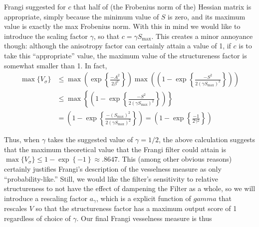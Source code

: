     Frangi suggested for $c$ that half of (the Frobenius norm of the) Hessian matrix is appropriate, simply because the minimum value of $S$ is zero, and its maximum value is exactly the max Frobenius norm. With this in mind we would like to introduce the scaling factor
    $\gamma$, so that $ c = \gamma S_{\max}$. This creates a minor annoyance though: although the anisotropy factor can certainly attain a value of 1, if $c$ is to take this ``appropriate'' value, the maximum value of the structureness factor is somewhat smaller than 1. In fact,
    \begin{equation}
    \begin{aligned}
    \max\{V_\sigma\} &\le \max\left(
                                    \exp\left\{\frac{-A^2}{2\beta^2}\right\}
                            \right)
                        \max\left(
                            \left(1 - \exp\left\{\frac{-S^2}{2(\gamma S_{\max})^2}\right\}\right)
                            \right) \\
                    &\le \max\left\{
                    \left(1 - \exp\left\{\frac{-S^2}{2(\gamma S_{\max})^2}\right\}\right)
                    \right\} \\
                    &= 
                    \left(1 - \exp\left\{\frac{-(S_{\max})^2}{2(\gamma S_{\max})^2}\right\}
                    \right)
                    = \left(1 - \exp\left\{\frac{-1}{2\gamma^2}\right\}
                    \right)
    \end{aligned}
    \end{equation}
    
    Thus, when $\gamma$ takes the suggested value of $\gamma = 1/2$, the above calculation suggests that
    the maximum theoretical value that the Frangi filter could attain is
    $ \max \{ V_\sigma \} \le 1 - \exp\left\{ -1 \right\} \approx .8647$.
    This (among other obvious reasons) certainly justifies Frangi's description of the vesselness measure as only ``probability-like.'' Still, we would like the filter's sensitivity to relative structureness to not have the effect of dampening the Filter as a whole, so we will introduce a rescaling factor $a_\gamma$, which is a explicit function of $gamma$ that rescales $V$ so that the structureness factor has a maximum output score of 1 regardless of choice of $\gamma$. Our final Frangi vesselness measure is thus
    
